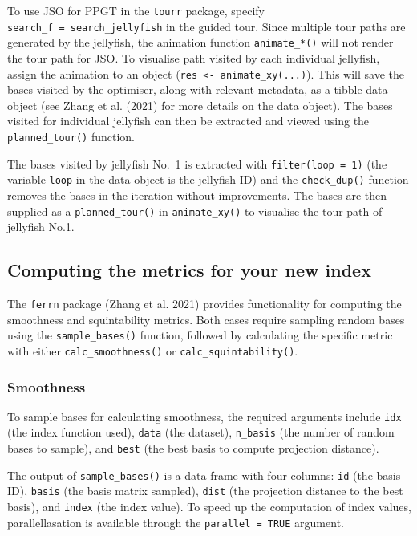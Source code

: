 \documentclass[
  12pt,
]{interact}
\theoremstyle{plain}
\begin{document}
To use JSO for PPGT in the \texttt{tourr} package, specify
\texttt{search\_f\ =\ search\_jellyfish} in the guided tour. Since
multiple tour paths are generated by the jellyfish, the animation
function \texttt{animate\_*()} will not render the tour path for JSO. To
visualise path visited by each individual jellyfish, assign the
animation to an object (\texttt{res\ \textless{}-\ animate\_xy(...)}).
This will save the bases visited by the optimiser, along with relevant
metadata, as a tibble data object (see Zhang et al. (2021) for more
details on the data object). The bases visited for individual jellyfish
can then be extracted and viewed using the \texttt{planned\_tour()}
function.

The bases visited by jellyfish No.~1 is extracted with
\texttt{filter(loop\ =\ 1)} (the variable \texttt{loop} in the data
object is the jellyfish ID) and the \texttt{check\_dup()} function
removes the bases in the iteration without improvements. The bases are
then supplied as a \texttt{planned\_tour()} in \texttt{animate\_xy()} to
visualise the tour path of jellyfish No.1.

\hypertarget{computing-the-metrics-for-your-new-index}{%
\subsection{Computing the metrics for your new
index}\label{computing-the-metrics-for-your-new-index}}

The \texttt{ferrn} package (Zhang et al. 2021) provides functionality
for computing the smoothness and squintability metrics. Both cases
require sampling random bases using the \texttt{sample\_bases()}
function, followed by calculating the specific metric with either
\texttt{calc\_smoothness()} or \texttt{calc\_squintability()}.

\hypertarget{smoothness}{%
\subsubsection{Smoothness}\label{smoothness}}

To sample bases for calculating smoothness, the required arguments
include \texttt{idx} (the index function used), \texttt{data} (the
dataset), \texttt{n\_basis} (the number of random bases to sample), and
\texttt{best} (the best basis to compute projection distance).

The output of \texttt{sample\_bases()} is a data frame with four
columns: \texttt{id} (the basis ID), \texttt{basis} (the basis matrix
sampled), \texttt{dist} (the projection distance to the best basis), and
\texttt{index} (the index value). To speed up the computation of index
values, parallellasation is available through the
\texttt{parallel\ =\ TRUE} argument.
\end{document}
